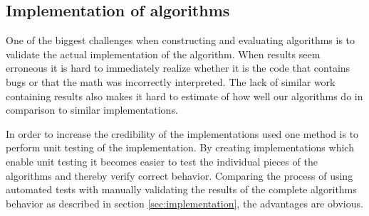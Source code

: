 \subsection{Implementation of algorithms}

One of the biggest challenges when constructing and evaluating algorithms is to
validate the actual implementation of the algorithm. When results seem 
erroneous it is hard to immediately realize whether it is the code that contains bugs or that the 
math was incorrectly interpreted. The lack of similar work containing results
also makes it hard to estimate of how well our algorithms do in comparison 
to similar implementations.

In order to increase the credibility of the implementations used one method is
to perform unit testing of the implementation. By creating implementations
which enable unit testing it becomes easier to test the individual pieces of
the algorithms and thereby verify correct behavior. Comparing the process of
using automated tests with manually validating the results of the complete
algorithms behavior as described in section \ref{sec:implementation}, the
advantages are obvious.
